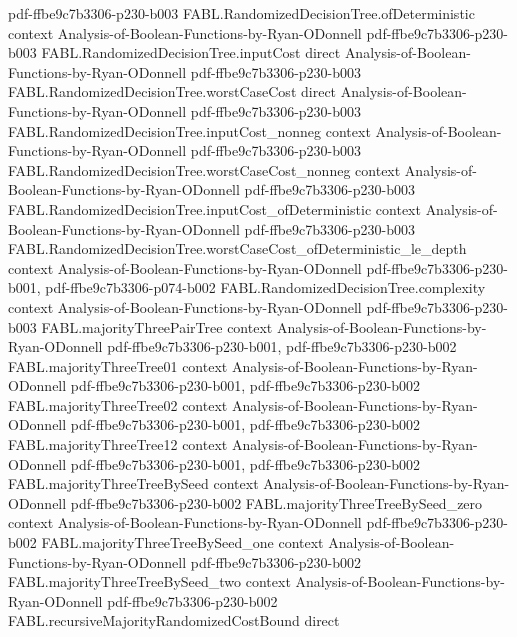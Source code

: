\begin{theorem}
  {pdf-ffbe9c7b3306-p230-b003}
\proofstep
  {FABL.RandomizedDecisionTree.ofDeterministic}
  {context}
  {Analysis-of-Boolean-Functions-by-Ryan-ODonnell}
  {pdf-ffbe9c7b3306-p230-b003}
\proofstep
  {FABL.RandomizedDecisionTree.inputCost}
  {direct}
  {Analysis-of-Boolean-Functions-by-Ryan-ODonnell}
  {pdf-ffbe9c7b3306-p230-b003}
\proofstep
  {FABL.RandomizedDecisionTree.worstCaseCost}
  {direct}
  {Analysis-of-Boolean-Functions-by-Ryan-ODonnell}
  {pdf-ffbe9c7b3306-p230-b003}
\proofstep
  {FABL.RandomizedDecisionTree.inputCost_nonneg}
  {context}
  {Analysis-of-Boolean-Functions-by-Ryan-ODonnell}
  {pdf-ffbe9c7b3306-p230-b003}
\proofstep
  {FABL.RandomizedDecisionTree.worstCaseCost_nonneg}
  {context}
  {Analysis-of-Boolean-Functions-by-Ryan-ODonnell}
  {pdf-ffbe9c7b3306-p230-b003}
\proofstep
  {FABL.RandomizedDecisionTree.inputCost_ofDeterministic}
  {context}
  {Analysis-of-Boolean-Functions-by-Ryan-ODonnell}
  {pdf-ffbe9c7b3306-p230-b003}
\proofstep
  {FABL.RandomizedDecisionTree.worstCaseCost_ofDeterministic_le_depth}
  {context}
  {Analysis-of-Boolean-Functions-by-Ryan-ODonnell}
  {pdf-ffbe9c7b3306-p230-b001,
    pdf-ffbe9c7b3306-p074-b002}
\proofstep
  {FABL.RandomizedDecisionTree.complexity}
  {context}
  {Analysis-of-Boolean-Functions-by-Ryan-ODonnell}
  {pdf-ffbe9c7b3306-p230-b003}
\proofstep
  {FABL.majorityThreePairTree}
  {context}
  {Analysis-of-Boolean-Functions-by-Ryan-ODonnell}
  {pdf-ffbe9c7b3306-p230-b001,
    pdf-ffbe9c7b3306-p230-b002}
\proofstep
  {FABL.majorityThreeTree01}
  {context}
  {Analysis-of-Boolean-Functions-by-Ryan-ODonnell}
  {pdf-ffbe9c7b3306-p230-b001,
    pdf-ffbe9c7b3306-p230-b002}
\proofstep
  {FABL.majorityThreeTree02}
  {context}
  {Analysis-of-Boolean-Functions-by-Ryan-ODonnell}
  {pdf-ffbe9c7b3306-p230-b001,
    pdf-ffbe9c7b3306-p230-b002}
\proofstep
  {FABL.majorityThreeTree12}
  {context}
  {Analysis-of-Boolean-Functions-by-Ryan-ODonnell}
  {pdf-ffbe9c7b3306-p230-b001,
    pdf-ffbe9c7b3306-p230-b002}
\proofstep
  {FABL.majorityThreeTreeBySeed}
  {context}
  {Analysis-of-Boolean-Functions-by-Ryan-ODonnell}
  {pdf-ffbe9c7b3306-p230-b002}
\proofstep
  {FABL.majorityThreeTreeBySeed_zero}
  {context}
  {Analysis-of-Boolean-Functions-by-Ryan-ODonnell}
  {pdf-ffbe9c7b3306-p230-b002}
\proofstep
  {FABL.majorityThreeTreeBySeed_one}
  {context}
  {Analysis-of-Boolean-Functions-by-Ryan-ODonnell}
  {pdf-ffbe9c7b3306-p230-b002}
\proofstep
  {FABL.majorityThreeTreeBySeed_two}
  {context}
  {Analysis-of-Boolean-Functions-by-Ryan-ODonnell}
  {pdf-ffbe9c7b3306-p230-b002}
\proofstep
  {FABL.recursiveMajorityRandomizedCostBound}
  {direct}

\end{theorem}
